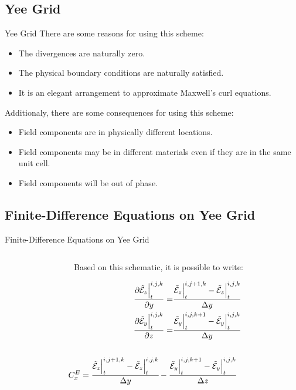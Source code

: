 \documentclass[aspectratio=169]{beamer}
\begin{document}
\subsection{Yee Grid}

\begin{frame}{Yee Grid}
  There are some reasons for using this scheme:
\begin{itemize}
    \item The divergences are naturally zero.
    \item The physical boundary conditions are naturally satisfied.
    \item It is an elegant arrangement to approximate Maxwell's curl equations.
\end{itemize}

Additionaly, there are some consequences for using this scheme:
\begin{itemize}
    \item Field components are in physically different locations.
    \item Field components may be in different materials even if they are in the same unit cell.
    \item Field components will be out of phase.
\end{itemize}
\end{frame}

\subsection{Finite-Difference Equations on Yee Grid}

\begin{frame}{Finite-Difference Equations on Yee Grid}
  \begin{columns}
    \begin{column}{0.50\textwidth}
      \resizebox{\textwidth}{!}
      {
        \centering
        
      }
    \end{column}
    \begin{column}{0.5\textwidth}
      Based on this schematic, it is possible to write:
      \begin{small}
        \begin{align}
            \frac{\partial \tilde{\mathcal{E}}_z\Big|^{i,j,k}_t}{\partial y} =& \cfrac{\tilde{\mathcal{E}}_z\Big|^{i,j+1,k}_t-\tilde{\mathcal{E}}_z\Big|^{i,j,k}_t}{\Delta y} \\
            \frac{\partial \tilde{\mathcal{E}}_y\Big|^{i,j,k}_t}{\partial z} =& \cfrac{\tilde{\mathcal{E}}_y\Big|^{i,j,k+1}_t-\tilde{\mathcal{E}}_y\Big|^{i,j,k}_t}{\Delta y}
        \end{align}    

      \end{small}
    \end{column}

  \end{columns}
  \begin{align}
    C_x^E = \cfrac{\tilde{\mathcal{E}}_z\Big|^{i,j+1,k}_t-\tilde{\mathcal{E}}_z\Big|^{i,j,k}_t}{\Delta y} - \cfrac{\tilde{\mathcal{E}}_y\Big|^{i,j,k+1}_t-\tilde{\mathcal{E}}_y\Big|^{i,j,k}_t}{\Delta z}
    \label{eq:CEx}
\end{align}
\end{frame}
\end{document}
